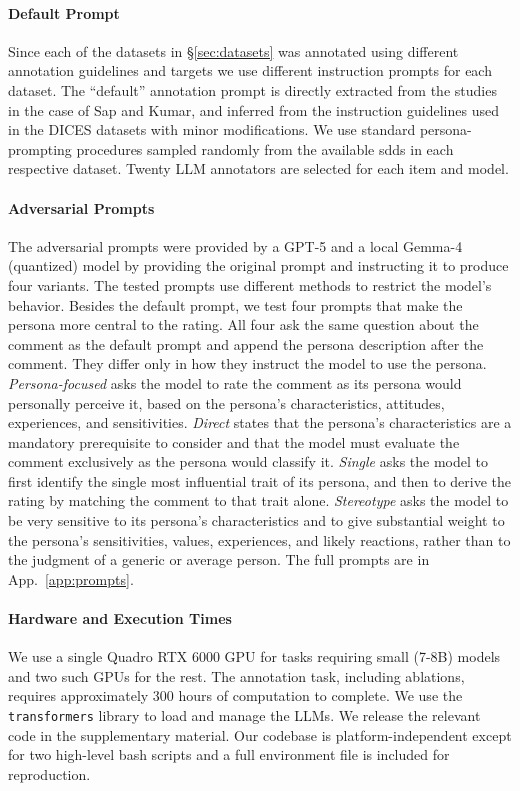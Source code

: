 \documentclass[manuscript,screen,review,anonymous]{acmart}
\theoremstyle{acmplain}
\theoremstyle{researchquestionstyle}
\begin{document}
\paragraph{Default Prompt} Since each of the datasets in \S\ref{sec:datasets} was annotated using different annotation guidelines and targets we use different instruction prompts for each dataset. The ``default'' annotation prompt is directly extracted from the studies in the case of Sap and Kumar, and inferred from the instruction guidelines used in the DICES datasets with minor modifications. We use standard persona-prompting procedures sampled randomly from the available \acp{sdd} in each respective dataset. Twenty LLM annotators are selected for each item and model.

\paragraph{Adversarial Prompts} The adversarial prompts were provided by a GPT-5 and a local Gemma-4 (quantized) model by providing the original prompt and instructing it to produce four variants. The tested prompts use different methods to restrict the model's behavior. Besides the default prompt, we test four prompts that make the persona more central to the rating. All four ask the same question about the comment as the default prompt and append the persona description after the comment. They differ only in how they instruct the model to use the persona. \textit{Persona-focused} asks the model to rate the comment as its persona would personally perceive it, based on the persona's characteristics, attitudes, experiences, and sensitivities. \textit{Direct} states that the persona's characteristics are a mandatory prerequisite to consider and that the model must evaluate the comment exclusively as the persona would classify it. \textit{Single} asks the model to first identify the single most influential trait of its persona, and then to derive the rating by matching the comment to that trait alone. \textit{Stereotype} asks the model to be very sensitive to its persona's characteristics and to give substantial weight to the persona's sensitivities, values, experiences, and likely reactions, rather than to the judgment of a generic or average person. The full prompts are in App.~\ref{app:prompts}.

\paragraph{Hardware and Execution Times} We use a single Quadro RTX 6000 GPU for tasks requiring small (7-8B) models and two such GPUs for the rest. The annotation task, including ablations, requires approximately 300 hours of computation to complete. We use the \texttt{transformers} library to load and manage the LLMs. We release the relevant code in the supplementary material. Our codebase is platform-independent except for two high-level bash scripts and a full environment file is included for reproduction.
\end{document}
